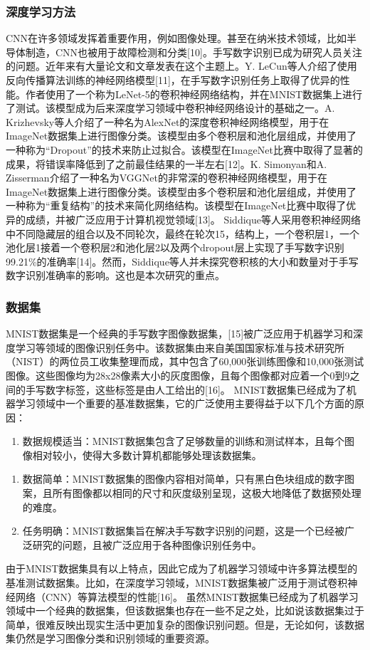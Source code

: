 \documentclass[11pt]{article}
\begin{document}
\subsubsection{深度学习方法}
\label{sec:orgf2f6dbb}
CNN在许多领域发挥着重要作用，例如图像处理。甚至在纳米技术领域，比如半导体制造，CNN也被用于故障检测和分类[10]。手写数字识别已成为研究人员关注的问题。近年来有大量论文和文章发表在这个主题上。Y. LeCun等人介绍了使用反向传播算法训练的神经网络模型[11]，在手写数字识别任务上取得了优异的性能。作者使用了一个称为LeNet-5的卷积神经网络结构，并在MNIST数据集上进行了测试。该模型成为后来深度学习领域中卷积神经网络设计的基础之一。A. Krizhevsky等人介绍了一种名为AlexNet的深度卷积神经网络模型，用于在ImageNet数据集上进行图像分类。该模型由多个卷积层和池化层组成，并使用了一种称为“Dropout”的技术来防止过拟合。该模型在ImageNet比赛中取得了显著的成果，将错误率降低到了之前最佳结果的一半左右[12]。K. Simonyan和A. Zisserman介绍了一种名为VGGNet的非常深的卷积神经网络模型，用于在ImageNet数据集上进行图像分类。该模型由多个卷积层和池化层组成，并使用了一种称为“重复结构”的技术来简化网络结构。该模型在ImageNet比赛中取得了优异的成绩，并被广泛应用于计算机视觉领域[13]。
Siddique等人采用卷积神经网络中不同隐藏层的组合以及不同轮次，最终在轮次15，结构上，一个卷积层1，一个池化层1接着一个卷积层2和池化层2以及两个dropout层上实现了手写数字识别99.21\%的准确率[14]。然而，Siddique等人并未探究卷积核的大小和数量对于手写数字识别准确率的影响。这也是本次研究的重点。
\subsubsection{数据集}
\label{sec:org5f438cd}
MNIST数据集是一个经典的手写数字图像数据集，[15]被广泛应用于机器学习和深度学习等领域的图像识别任务中。该数据集由来自美国国家标准与技术研究所（NIST）的两位员工收集整理而成，其中包含了60,000张训练图像和10,000张测试图像。这些图像均为28x28像素大小的灰度图像，且每个图像都对应着一个0到9之间的手写数字标签，这些标签是由人工给出的[16]。
MNIST数据集已经成为了机器学习领域中一个重要的基准数据集，它的广泛使用主要得益于以下几个方面的原因：
\begin{enumerate}
\item 数据规模适当：MNIST数据集包含了足够数量的训练和测试样本，且每个图像相对较小，使得大多数计算机都能够处理该数据集。
\end{enumerate}
\begin{enumerate}
\item 数据简单：MNIST数据集的图像内容相对简单，只有黑白色块组成的数字图案，且所有图像都以相同的尺寸和灰度级别呈现，这极大地降低了数据预处理的难度。
\item 任务明确：MNIST数据集旨在解决手写数字识别的问题，这是一个已经被广泛研究的问题，且被广泛应用于各种图像识别任务中。
\end{enumerate}
由于MNIST数据集具有以上特点，因此它成为了机器学习领域中许多算法模型的基准测试数据集。比如，在深度学习领域，MNIST数据集被广泛用于测试卷积神经网络（CNN）等算法模型的性能[16]。
虽然MNIST数据集已经成为了机器学习领域中一个经典的数据集，但该数据集也存在一些不足之处，比如说该数据集过于简单，很难反映出现实生活中更加复杂的图像识别问题。但是，无论如何，该数据集仍然是学习图像分类和识别领域的重要资源。
\end{document}
